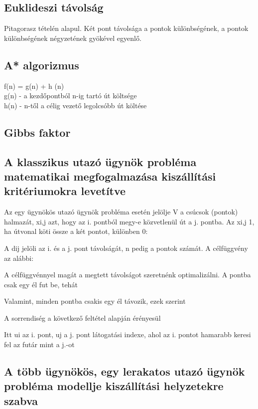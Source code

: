 \subsection{
Euklideszi távolság
}

Pitagorasz tételén alapul. Két pont távolsága a pontok különbségének, a pontok különbségének négyzetének gyökével egyenlő.

\subsection{
A* algorizmus
}

f(n) = g(n) + h (n) \\
g(n) - a kezdőpontból n-ig tartó út költsége \\
h(n) - n-től a célig vezető legolcsóbb út költése 

\subsection{
Gibbs faktor
}

\subsection{
A klasszikus utazó ügynök probléma matematikai megfogalmazása kiszállítási kritériumokra levetítve
}

Az egy ügynökös utazó ügynök probléma esetén jelölje V a csúcsok (pontok) halmazát, xi,j azt, hogy az i. pontból megy-e közvetlenül út a j. pontba. Az xi,j 1, ha útvonal köti össze a két pontot, különben 0:

A dij jelöli az i. és a j. pont távolságát, n pedig a pontok számát. A célfüggvény az alábbi:

A célfüggvénnyel magát a megtett távolságot szeretnénk optimalizálni. A pontba csak egy él fut be, tehát

Valamint, minden pontba csakis egy él távozik, ezek szerint

A sorrendiség a következő feltétel alapján érényesül

Itt ui az i. pont, uj a j. pont látogatási indexe, ahol az i. pontot hamarabb keresi fel az futár mint a j.-ot

\subsection{
A több ügynökös, egy lerakatos utazó ügynök probléma modellje kiszállítási helyzetekre szabva
}

